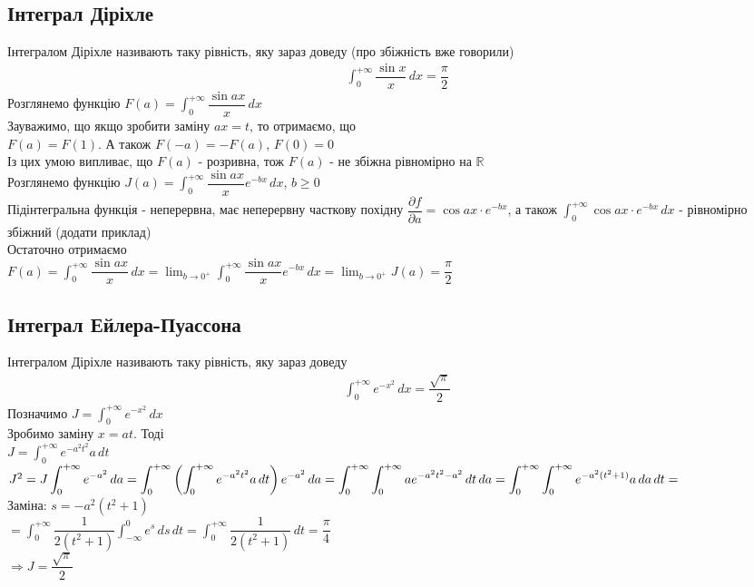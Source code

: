 \documentclass[a4paper, 14pt]{extarticle}
\def\departial#1#2{\dfrac{\partial {#1}}{\partial {#2}}}
\def\huge{\displaystyle}
\theoremstyle{theoremdd}
\theoremstyle{theoremdd}
\theoremstyle{theoremdd}
\theoremstyle{theoremdd}
\theoremstyle{theoremdd}
\theoremstyle{theoremdd}
\theoremstyle{theoremdd}
\begin{document}
\subsection{Інтеграл Діріхле}
Інтегралом Діріхле називають таку рівність, яку зараз доведу (про збіжність вже говорили)
\begin{align*}
\int_0^{+\infty} \dfrac{\sin x}{x}\,dx = \dfrac{\pi}{2}
\end{align*}
Розглянемо функцію $F(a) = \huge \int_0^{+\infty} \dfrac{\sin ax}{x}\,dx$\\
Зауважимо, що якщо зробити заміну $ax =t$, то отримаємо, що \\ $F(a) = F(1)$. А також $F(-a) = -F(a)$, $F(0)=0$\\
Із цих умою випливає, що $F(a)$ - розривна, тож $F(a)$ - не збіжна рівномірно на $\mathbb{R}$\\
Розглянемо функцію $J(a) = \huge \int_0^{+\infty} \dfrac{\sin ax}{x} e^{-bx}\,dx$, $b \geq 0$\\
Підінтегральна функція - неперервна, має неперервну часткову похідну $\departial{f}{a} = \cos ax \cdot e^{-bx}$, а також $\huge \int_0^{+\infty} \cos ax \cdot e^{-bx}\,dx$ - рівномірно збіжний (додати приклад)\\
Остаточно отримаємо\\
$F(a) = \huge \int_0^{+\infty} \dfrac{\sin ax}{x}\,dx = \lim_{b \to 0^+} \int_0^{+\infty} \dfrac{\sin ax}{x} e^{-bx}\,dx = \lim_{b \to 0^+} J(a) = \dfrac{\pi}{2}$

\subsection{Інтеграл Ейлера-Пуассона}
Інтегралом Діріхле називають таку рівність, яку зараз доведу
\begin{align*}
\int_0^{+\infty} e^{-x^2}\,dx = \dfrac{\sqrt{\pi}}{2}
\end{align*}
Позначимо $J = \huge \int_0^{+\infty} e^{-x^2}\,dx$\\
Зробимо заміну $x = at$. Тоді\\
$J = \huge \int_0^{+\infty} e^{-a^2 t^2}a \,dt$\\
$J^2 = \huge J \int_0^{+\infty} e^{-a^2}\,da = \int_0^{+\infty} \left( \int_0^{+\infty} e^{-a^2 t^2} a\,dt \right) e^{-a^2}\,da = \int_0^{+\infty} \int_0^{+\infty} ae^{-a^2t^2-a^2}\,dt\,da \\ = \int_0^{+\infty} \int_0^{+\infty} e^{-a^2(t^2+1)} a\,da \,dt =$\\
Заміна: $s = -a^2(t^2+1)$\\
$= \huge \int_0^{+\infty} \dfrac{1}{2(t^2+1)} \int_{-\infty}^0 e^s\,ds\,dt = \int_0^{+\infty} \dfrac{1}{2(t^2+1)}\,dt = \dfrac{\pi}{4}$\\
$\Rightarrow J = \dfrac{\sqrt{\pi}}{2}$
\end{document}
